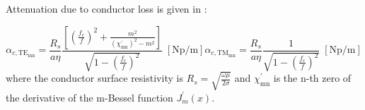 \documentclass[english,twoside]{article}
\begin{document}
      Attenuation due to conductor loss is given in \cite{pozar}:
      
      \begin{subequations}
      	\begin{equation}
      		\alpha_{c,\textrm{TE}_\textrm{mn}}=\frac{R_s}{a \eta} \frac{\left[\left(\frac{f_c}{f}\right)^2+\frac{m^2}{\left(\chi_{\textrm{mn}}^{'}\right)^2-m^2}\right]}{\sqrt{1-\left(\frac{f_c}{f}\right)^2}}\;[\mathrm{Np}/\mathrm{m}]
      	\end{equation}
      	\begin{equation}
      		\alpha_{c,\textrm{TM}_\textrm{mn}}=\frac{R_s}{a \eta} \frac{1}{\sqrt{1-\left(\frac{f_c}{f}\right)^2}}\;[\mathrm{Np}/\mathrm{m}]
      	\end{equation}
      \end{subequations}
      where the conductor surface resistivity is $R_s=\sqrt{\frac{\omega\mu}{2\sigma}}$ and $\chi_{\textrm{mn}}^{'}$ is the n-th zero of the derivative of the m-Bessel function $J_m^{'}(x)$.\\
      	  
\end{document}
